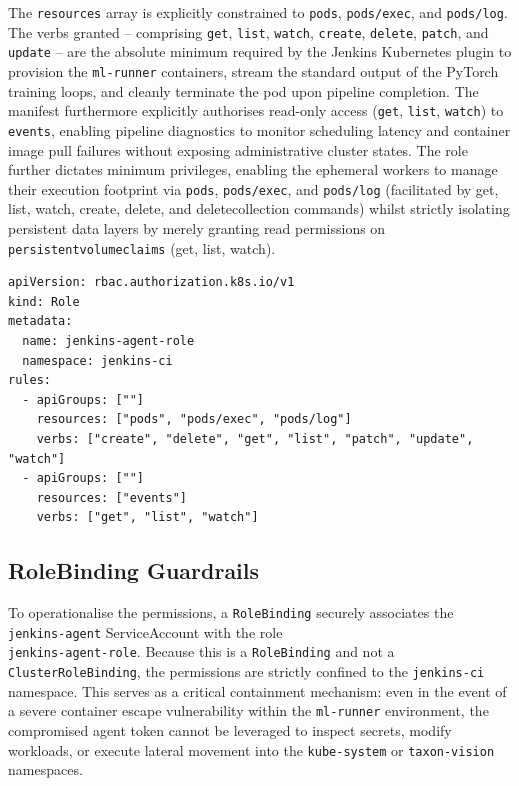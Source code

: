 The \texttt{resources} array is explicitly constrained to \texttt{pods}, \texttt{pods/exec}, and \texttt{pods/log}. The verbs granted -- comprising \texttt{get}, \texttt{list}, \texttt{watch}, \texttt{create}, \texttt{delete}, \texttt{patch}, and \texttt{update} -- are the absolute minimum required by the Jenkins Kubernetes plugin to provision the \texttt{ml-runner} containers, stream the standard output of the PyTorch training loops, and cleanly terminate the pod upon pipeline completion. The manifest furthermore explicitly authorises read-only access (\texttt{get}, \texttt{list}, \texttt{watch}) to \texttt{events}, enabling pipeline diagnostics to monitor scheduling latency and container image pull failures without exposing administrative cluster states. The role further dictates minimum privileges, enabling the ephemeral workers to manage their execution footprint via \texttt{pods}, \texttt{pods/exec}, and \texttt{pods/log} (facilitated by get, list, watch, create, delete, and deletecollection commands) whilst strictly isolating persistent data layers by merely granting read permissions on \texttt{persistentvolumeclaims} (get, list, watch).

\begin{listing}[H]
\begin{verbatim}
apiVersion: rbac.authorization.k8s.io/v1
kind: Role
metadata:
  name: jenkins-agent-role
  namespace: jenkins-ci
rules:
  - apiGroups: [""]
    resources: ["pods", "pods/exec", "pods/log"]
    verbs: ["create", "delete", "get", "list", "patch", "update", "watch"]
  - apiGroups: [""]
    resources: ["events"]
    verbs: ["get", "list", "watch"]
\end{verbatim}
\caption{Role specification bounding API permissions to the minimum necessary pod operations.}
\label{lst:role}
\end{listing}

\subsection{RoleBinding Guardrails}
To operationalise the permissions, a \texttt{RoleBinding} securely associates the \texttt{jenkins-agent} ServiceAccount with the role\\\texttt{jenkins-agent-role}. Because this is a \texttt{RoleBinding} and not a \texttt{ClusterRoleBinding}, the permissions are strictly confined to the \texttt{jenkins-ci} namespace. This serves as a critical containment mechanism: even in the event of a severe container escape vulnerability within the \texttt{ml-runner} environment, the compromised agent token cannot be leveraged to inspect secrets, modify workloads, or execute lateral movement into the \texttt{kube-system} or \texttt{taxon-vision} namespaces.

